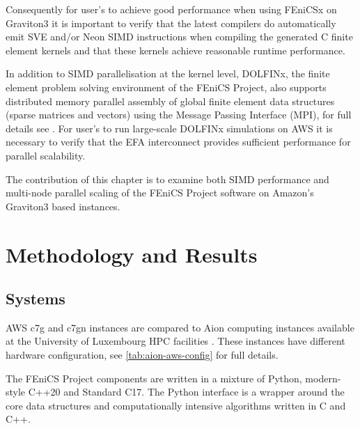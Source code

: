 Consequently for user's to achieve good performance when using FEniCSx on
Graviton3 it is important to verify that the latest compilers do automatically
emit SVE and/or Neon SIMD instructions when compiling the generated C finite
element kernels and that these kernels achieve reasonable runtime performance. 

In addition to SIMD parallelisation at the kernel level, DOLFINx, the finite
element problem solving environment of the FEniCS Project, also supports
distributed memory parallel assembly of global finite element data structures
(sparse matrices and vectors) using the Message Passing Interface (MPI), for
full details see \cite{baratta_dolfinx_2023}. For user's to run large-scale
DOLFINx simulations on AWS it is necessary to verify that the EFA interconnect
provides sufficient performance for parallel scalability.

The contribution of this chapter is to examine both SIMD performance and
multi-node parallel scaling of the FEniCS Project software on Amazon's
Graviton3 based instances. 

\section*{Methodology and Results}

\subsection*{Systems}
AWS c7g and c7gn instances are compared to Aion computing instances available
at the University of Luxembourg HPC facilities \citep{VCPKVO_HPCCT22}. These
instances have different hardware configuration, see
\autoref{tab:aion-aws-config} for full details.

The FEniCS Project components are written in a mixture of Python, modern-style
C++20 and Standard C17. The Python interface is a wrapper around the core data
structures and computationally intensive algorithms written in C and C++.

